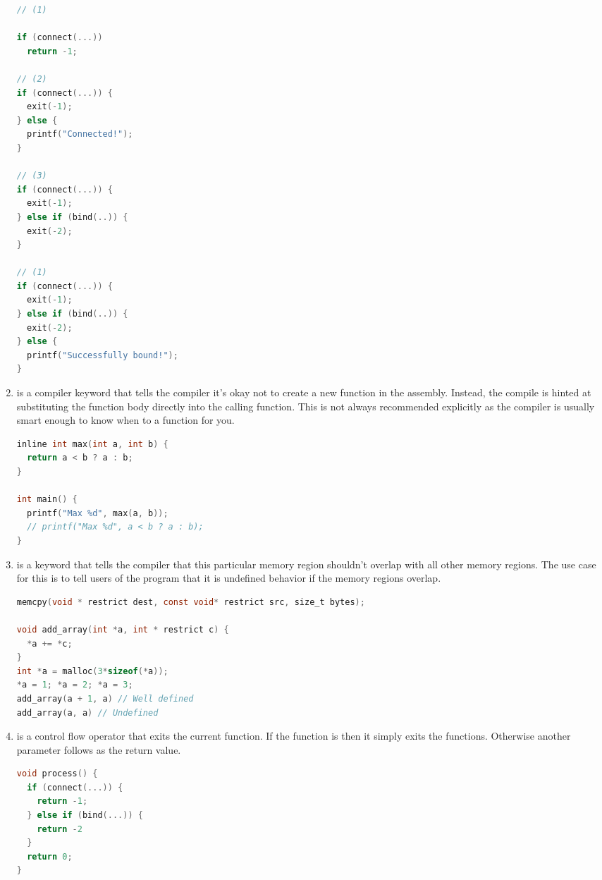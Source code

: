 \begin{enumerate}
	      \begin{lstlisting}[language=C]
// (1)

if (connect(...))
  return -1;

// (2)
if (connect(...)) {
  exit(-1);
} else {
  printf("Connected!");
}

// (3)
if (connect(...)) {
  exit(-1);
} else if (bind(..)) {
  exit(-2);
}

// (1)
if (connect(...)) {
  exit(-1);
} else if (bind(..)) {
  exit(-2);
} else {
  printf("Successfully bound!");
}
\end{lstlisting}

	    \item {} is a compiler keyword that tells the compiler it's okay not to create a new function in the assembly.
        Instead, the compile is hinted at substituting the function body directly into the calling function.
        This is not always recommended explicitly as the compiler is usually smart enough to know when to  a function for you.

	      \begin{lstlisting}[language=C]
inline int max(int a, int b) {
  return a < b ? a : b;
}

int main() {
  printf("Max %d", max(a, b));
  // printf("Max %d", a < b ? a : b);
}
\end{lstlisting}

	    \item {} is a keyword that tells the compiler that this particular memory region shouldn't overlap with all other memory regions.
        The use case for this is to tell users of the program that it is undefined behavior if the memory regions overlap.

	      \begin{lstlisting}[language=C]
memcpy(void * restrict dest, const void* restrict src, size_t bytes);

void add_array(int *a, int * restrict c) {
  *a += *c;
}
int *a = malloc(3*sizeof(*a));
*a = 1; *a = 2; *a = 3;
add_array(a + 1, a) // Well defined
add_array(a, a) // Undefined
\end{lstlisting}
	    \item {} is a control flow operator that exits the current function.
        If the function is  then it simply exits the functions.
        Otherwise another parameter follows as the return value.

	      \begin{lstlisting}[language=C]
void process() {
  if (connect(...)) {
    return -1;
  } else if (bind(...)) {
    return -2
  }
  return 0;
}
\end{lstlisting}


\end{enumerate}
